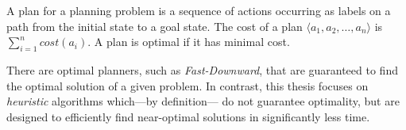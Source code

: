 \begin{definition}[Plan]
	\label{def:plan}
	A plan for a planning problem is a sequence of actions occurring as labels on a path
	from the initial state to a goal state.
	The cost of a plan $\langle a_1, a_2, \dots, a_n \rangle$ is $\sum_{i = 1}^n cost(a_i)$.
	A plan is optimal if it has minimal cost.
\end{definition}

There are optimal planners, such as \textit{Fast-Downward}, that are guaranteed to find the optimal solution of a given problem.
In contrast, this thesis focuses on \textit{heuristic} algorithms which—by definition— do not
guarantee optimality, but are designed to efficiently find near-optimal solutions in significantly less time.

